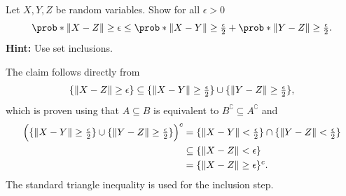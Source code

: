 
\begin{exercise}[subtitle={Stochastic triangle inequality \Coffeecup}]
    \label{ex: stochastic triangle}
    Let \(X,Y,Z\) be random variables. Show for all \(\epsilon > 0\)
    \[
        \prob*{\norm{X - Z} \ge \epsilon} \le \prob*{\norm{X - Y} \ge \tfrac\epsilon2} + \prob*{\norm{Y - Z} \ge \tfrac\epsilon2}.
    \] 
    \textbf{Hint:} Use set inclusions.
\end{exercise}
\begin{solution}
    The claim follows directly from
    \[
        \{\lVert X - Z\rVert \ge \epsilon\}
        \subseteq \{\lVert X - Y\rVert \ge \tfrac\epsilon2\} \cup \{\lVert Y - Z\rVert \ge \tfrac\epsilon2\},
    \]
    which is proven using that \(A \subseteq B\) is equivalent
    to \(B^\complement \subseteq A^\complement\) and
    \begin{align*}
        \Bigl(\{\lVert X - Y\rVert \ge \tfrac\epsilon2\} \cup \{\lVert Y - Z\rVert \ge \tfrac\epsilon2\}\Bigr)^c
        &=\{\lVert X - Y\rVert < \tfrac\epsilon2\} \cap \{\lVert Y - Z\rVert < \tfrac\epsilon2\}
        \\
        &\subseteq \{\lVert X - Z\rVert < \epsilon\}
        \\
        &= \{\lVert X - Z\rVert \ge \epsilon\}^c.
    \end{align*}
    The standard triangle inequality is used for the inclusion step.
\end{solution}
